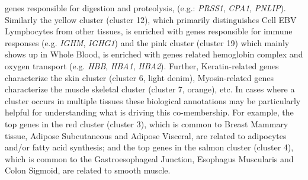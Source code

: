 
genes responsible for digestion and proteolysis, (e.g.: \textit{PRSS1}, \textit{CPA1}, \textit{PNLIP}). Similarly the yellow cluster (cluster 12), which primarily distinguishes Cell EBV Lymphocytes from other tissues, is enriched with genes responsible for immune responses (e.g. \textit{IGHM}, \textit{IGHG1}) and the pink cluster (cluster 19) which mainly shows up in Whole Blood, is enriched with genes related hemoglobin complex and oxygen transport (e.g. \textit{HBB}, \textit{HBA1}, \textit{HBA2}). Further, Keratin-related genes characterize the skin cluster (cluster 6, light denim), Myosin-related genes characterize the muscle skeletal cluster (cluster 7, orange), etc. In cases where a cluster occurs in multiple tissues these biological annotations may be particularly helpful for understanding what is driving this co-membership. For example, the top genes in the red cluster (cluster 3), which is common to Breast Mammary tissue, Adipose Subcutaneous and Adipose Visceral, are related to adipocytes and/or fatty acid synthesis; and the top genes in the salmon cluster (cluster 4), which is common to the Gastroesophageal Junction, Esophagus Muscularis and Colon Sigmoid, are related to smooth muscle.



